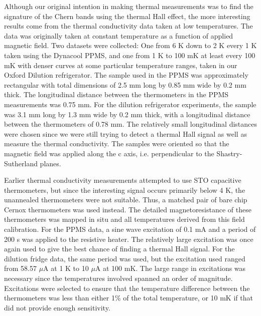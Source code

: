 \documentclass{thesis-umich}
\begin{document}
Although our original intention in making thermal measurements was to find the signature of the Chern bands using the thermal Hall effect, the more interesting results come from the thermal conductivity data taken at low temperatures. The data was originally taken at constant temperature as a function of applied magnetic field. Two datasets were collected: One from 6 K down to 2 K every 1 K taken using the Dynacool PPMS, and one from 1 K to 100 mK at least every 100 mK with denser curves at some particular temperature ranges, taken in our Oxford Dilution refrigerator. The sample used in the PPMS was approximately rectangular with total dimensions of 2.5 mm long by 0.85 mm wide by 0.2 mm thick. The longitudinal distance between the thermometers in the PPMS measurements was 0.75 mm. For the dilution refrigerator experiments, the sample was 3.1 mm long by 1.3 mm wide by 0.2 mm thick, with a longitudinal distance between the thermometers of 0.78 mm. The relatively small longitudinal distances were chosen since we were still trying to detect a thermal Hall signal as well as measure the thermal conductivity. The samples were oriented so that the magnetic field was applied along the c axis, i.e. perpendicular to the Shastry-Sutherland planes.

Earlier thermal conductivity measurements attempted to use STO capacitive thermometers, but since the interesting signal occurs primarily below 4 K, the unannealed thermometers were not suitable. Thus, a matched pair of bare chip Cernox thermometers was used instead. The detailed magnetoresistance of these thermometers was mapped in situ and all temperatures derived from this field calibration. For the PPMS data, a sine wave excitation of 0.1 mA and a period of 200 s was applied to the resistive heater. The relatively large excitation was once again used to give the best chance of finding a thermal Hall signal. For the dilution fridge data, the same period was used, but the excitation used ranged from 58.57 $\mu$A at 1 K to 10 $\mu$A at 100 mK. The large range in excitations was necessary since the temperatures involved spanned an order of magnitude. Excitations were selected to ensure that the temperature difference between the thermometers was less than either 1\% of the total temperature, or 10 mK if that did not provide enough sensitivity.
\end{document}
